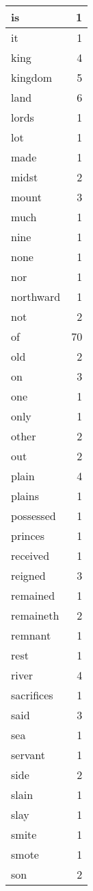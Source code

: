 \begin{center}
\begin{longtable}{l|r}
is & 1\\ \hline 
it & 1\\ \hline 
king & 4\\ \hline 
kingdom & 5\\ \hline 
land & 6\\ \hline 
lords & 1\\ \hline 
lot & 1\\ \hline 
made & 1\\ \hline 
midst & 2\\ \hline 
mount & 3\\ \hline 
much & 1\\ \hline 
nine & 1\\ \hline 
none & 1\\ \hline 
nor & 1\\ \hline 
northward & 1\\ \hline 
not & 2\\ \hline 
of & 70\\ \hline 
old & 2\\ \hline 
on & 3\\ \hline 
one & 1\\ \hline 
only & 1\\ \hline 
other & 2\\ \hline 
out & 2\\ \hline 
plain & 4\\ \hline 
plains & 1\\ \hline 
possessed & 1\\ \hline 
princes & 1\\ \hline 
received & 1\\ \hline 
reigned & 3\\ \hline 
remained & 1\\ \hline 
remaineth & 2\\ \hline 
remnant & 1\\ \hline 
rest & 1\\ \hline 
river & 4\\ \hline 
sacrifices & 1\\ \hline 
said & 3\\ \hline 
sea & 1\\ \hline 
servant & 1\\ \hline 
side & 2\\ \hline 
slain & 1\\ \hline 
slay & 1\\ \hline 
smite & 1\\ \hline 
smote & 1\\ \hline 
son & 2\\ \hline 

\end{longtable}
\end{center}
